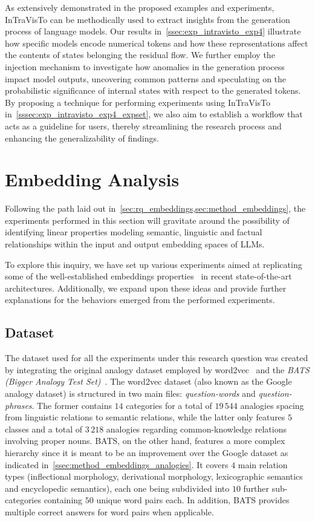 As extensively demonstrated in the proposed examples and experiments, InTraVisTo can be methodically used  to extract insights from the generation process of language models.
Our results in~\cref{ssec:exp_intravisto_exp4} illustrate how specific models encode numerical tokens and how these representations affect the contents of states belonging the residual flow.
We further employ the injection mechanism to investigate how anomalies in the generation process impact model outputs, uncovering common patterns and speculating on the probabilistic significance of internal states with respect to the generated tokens.
By proposing a technique for performing experiments using InTraVisTo in~\cref{sssec:exp_intravisto_exp4_expset}, we also aim to establish a workflow that acts as a guideline for users, thereby streamlining the research process and enhancing the generalizability of findings.

\section{Embedding Analysis}\label{sec:exp_emb}

Following the path laid out in~\cref{sec:rq_embeddings,sec:method_embeddings}, the experiments performed in this section will gravitate around the possibility of identifying linear properties modeling semantic, linguistic and factual relationships within the input and output embedding spaces of LLMs.

To explore this inquiry, we have set up various experiments aimed at replicating some of the well-established embeddings properties~\cite{mikolov2013} in recent state-of-the-art architectures.
Additionally, we expand upon these ideas and provide further explanations for the behaviors emerged from the performed experiments.

\subsection{Dataset}

The dataset used for all the experiments under this research question was created by integrating the original analogy dataset employed by word2vec~\cite{mikolov2013} and the \emph{BATS (Bigger Analogy Test Set)}~\cite{drozd2016}.
The word2vec dataset (also known as the Google analogy dataset) is structured in two main files: \emph{question-words} and \emph{question-phrases}.
The former contains $14$ categories for a total of $19\,544$ analogies spacing from linguistic relations to semantic relations, while the latter only features $5$ classes and a total of $3\,218$ analogies regarding common-knowledge relations involving proper nouns.
BATS, on the other hand, features a more complex hierarchy since it is meant to be an improvement over the Google dataset as indicated in~\cref{ssec:method_embeddings_analogies}.
It covers $4$ main relation types (inflectional morphology, derivational morphology, lexicographic semantics and encyclopedic semantics), each one being subdivided into $10$ further sub-categories containing $50$ unique word pairs each.
In addition, BATS provides multiple correct answers for word pairs when applicable.

